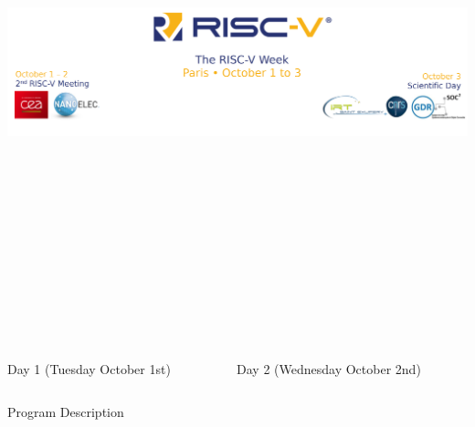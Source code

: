 \documentclass{beamer}
\newlength{\firstcolwidth}
\newlength{\othercolwidth}
\begin{document}
\begin{frame}[t]
    \begin{center}
    \includegraphics[height=15cm]{./images/banner.png}
    \end{center}

    \begin{columns}[t]
    \begin{column}{\firstcolwidth}
        \begin{block}{\centering Day 1 (Tuesday October 1st) }
            \vspace{1cm}
            {\tiny  }
        \end{block}
    \end{column}

    \begin{column}{\othercolwidth}
        \begin{block}{\centering Day 2 (Wednesday October 2nd) }
            \vspace{1cm}
            {\tiny  }
        \end{block}
    \end{column}
    \end{columns}

    \begin{block}{\centering Program Description}
    \begin{tiny}
    \begin{multicols}{3}
        
    \end{multicols}
    \end{tiny}

    \end{block}

\end{frame}
\end{document}
